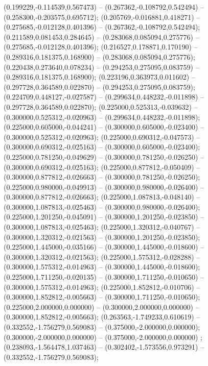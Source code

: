  (0.199229,-0.114539,0.567473) -- (0.267362,-0.108792,0.542494) -- (0.258300,-0.203575,0.695712);
 (0.205769,-0.016881,0.418271) -- (0.275685,-0.012128,0.401396) -- (0.267362,-0.108792,0.542494);
 (0.211589,0.081453,0.284645) -- (0.283068,0.085094,0.275776) -- (0.275685,-0.012128,0.401396);
 (0.216527,0.178871,0.170190) -- (0.289316,0.181375,0.168900) -- (0.283068,0.085094,0.275776);
 (0.220438,0.273640,0.078234) -- (0.294253,0.275095,0.083759) -- (0.289316,0.181375,0.168900);
 (0.223196,0.363973,0.011602) -- (0.297728,0.364589,0.022870) -- (0.294253,0.275095,0.083759);
 (0.224709,0.448127,-0.027587) -- (0.299634,0.448232,-0.011898) -- (0.297728,0.364589,0.022870);
 (0.225000,0.525313,-0.039632) -- (0.300000,0.525312,-0.020963) -- (0.299634,0.448232,-0.011898);
 (0.225000,0.605000,-0.044241) -- (0.300000,0.605000,-0.023400) -- (0.300000,0.525312,-0.020963);
 (0.225000,0.690312,-0.047573) -- (0.300000,0.690312,-0.025163) -- (0.300000,0.605000,-0.023400);
 (0.225000,0.781250,-0.049629) -- (0.300000,0.781250,-0.026250) -- (0.300000,0.690312,-0.025163);
 (0.225000,0.877812,-0.050409) -- (0.300000,0.877812,-0.026663) -- (0.300000,0.781250,-0.026250);
 (0.225000,0.980000,-0.049913) -- (0.300000,0.980000,-0.026400) -- (0.300000,0.877812,-0.026663);
 (0.225000,1.087813,-0.048140) -- (0.300000,1.087813,-0.025463) -- (0.300000,0.980000,-0.026400);
 (0.225000,1.201250,-0.045091) -- (0.300000,1.201250,-0.023850) -- (0.300000,1.087813,-0.025463);
 (0.225000,1.320312,-0.040767) -- (0.300000,1.320312,-0.021563) -- (0.300000,1.201250,-0.023850);
 (0.225000,1.445000,-0.035166) -- (0.300000,1.445000,-0.018600) -- (0.300000,1.320312,-0.021563);
 (0.225000,1.575312,-0.028288) -- (0.300000,1.575312,-0.014963) -- (0.300000,1.445000,-0.018600);
 (0.225000,1.711250,-0.020135) -- (0.300000,1.711250,-0.010650) -- (0.300000,1.575312,-0.014963);
 (0.225000,1.852812,-0.010706) -- (0.300000,1.852812,-0.005663) -- (0.300000,1.711250,-0.010650);
 (0.225000,2.000000,0.000000) -- (0.300000,2.000000,0.000000) -- (0.300000,1.852812,-0.005663);
 (0.263563,-1.749233,0.610619) -- (0.332552,-1.756279,0.569083) -- (0.375000,-2.000000,0.000000);
 (0.300000,-2.000000,0.000000) -- (0.375000,-2.000000,0.000000) ;
 (0.238093,-1.564478,1.037463) -- (0.302402,-1.573556,0.973291) -- (0.332552,-1.756279,0.569083);
